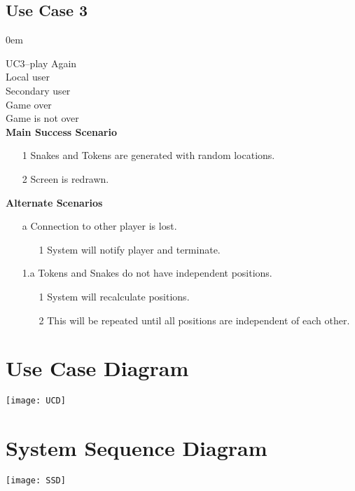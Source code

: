 \documentclass[titlepage]{article}
\begin{document}
	\subsection{Use Case 3}
	\itemsep0em 
	
	\textbf{} UC3--play Again\\
	\textbf{} Local user\\
	\textbf{} Secondary user\\
	\textbf{} Game over\\
	\textbf{} Game is not over\\
	\textbf{Main Success Scenario}
	\begin{enumerate}
		\itemsep0em 
		\item[1] Snakes and Tokens are generated with random locations.
		\item[2] Screen is redrawn.
	\end{enumerate}
	\textbf{Alternate Scenarios}
	\begin{enumerate}
		\itemsep0em 
		\item[a]Connection to other player is lost.
		\begin{enumerate}
			\itemsep0em 
			\item[1]System will notify player and terminate.
		\end{enumerate}
	\item[1.a]Tokens and Snakes do not have independent positions.
			\begin{enumerate}
		\itemsep0em 
		\item[1]System will recalculate positions.
		\item[2]This will be repeated until all positions are independent of each other.
	\end{enumerate}
		
	\end{enumerate}
	
	\section{Use Case Diagram}
	\texttt{[image: UCD]}
	
	\section{System Sequence Diagram}
	\texttt{[image: SSD]}
	
\end{document}
